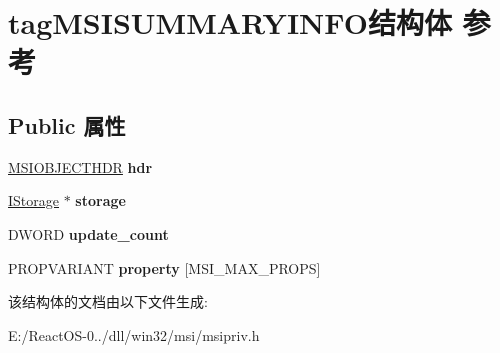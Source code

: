 \hypertarget{structtag_m_s_i_s_u_m_m_a_r_y_i_n_f_o}{}\section{tag\+M\+S\+I\+S\+U\+M\+M\+A\+R\+Y\+I\+N\+F\+O结构体 参考}
\label{structtag_m_s_i_s_u_m_m_a_r_y_i_n_f_o}
\subsection*{Public 属性}
\begin{DoxyCompactItemize}
\item 
\mbox{\label{structtag_m_s_i_s_u_m_m_a_r_y_i_n_f_o_a0d9fe85b329d8aac16153ca9e125649e}} 
\hyperlink{structtag_m_s_i_o_b_j_e_c_t_h_d_r}{M\+S\+I\+O\+B\+J\+E\+C\+T\+H\+DR} {\bfseries hdr}
\item 
\mbox{\label{structtag_m_s_i_s_u_m_m_a_r_y_i_n_f_o_a2cf6ee00b4b10dd79162be13b46068f2}} 
\hyperlink{interface_i_storage}{I\+Storage} $\ast$ {\bfseries storage}
\item 
\mbox{\label{structtag_m_s_i_s_u_m_m_a_r_y_i_n_f_o_ae060eb0b5814d2271c3f90d55c7e51c3}} 
D\+W\+O\+RD {\bfseries update\+\_\+count}
\item 
\mbox{\label{structtag_m_s_i_s_u_m_m_a_r_y_i_n_f_o_aa2bd41a0fe6d0f655c0f36dcd0e8506d}} 
P\+R\+O\+P\+V\+A\+R\+I\+A\+NT {\bfseries property} \mbox{[}M\+S\+I\+\_\+\+M\+A\+X\+\_\+\+P\+R\+O\+PS\mbox{]}
\end{DoxyCompactItemize}


该结构体的文档由以下文件生成\+:\begin{DoxyCompactItemize}
\item 
E\+:/\+React\+O\+S-\/0../dll/win32/msi/msipriv.\+h\end{DoxyCompactItemize}
